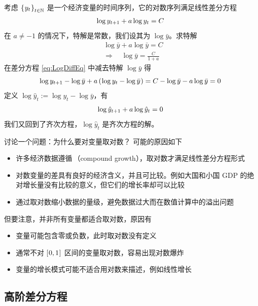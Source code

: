 考虑 \(\bkd{y_t}_{t\in\bb N}\) 是一个经济变量的时间序列，它的对数序列满足线性差分方程
\begin{align}\label{eq:LogDiffEq}
    \operatorname{log} y_{t+1}+a\operatorname{log} y_t=C
\end{align}
在 \(a\neq -1\) 的情况下，特解是常数，我们设其为 \(\log\bar y\)。求特解
\begin{align}
    &\log\bar y + a\log\bar y = C \label{eq:LogDiffEqTrend}\\
    &\Rightarrow \quad \log \bar y = \frac C{1+a}
\end{align}
在差分方程 \ref{eq:LogDiffEq} 中减去特解 \(\log\bar y\) 得
\begin{equation}
    \operatorname{log} y_{t+1} - \operatorname{log}\bar y + a\left(\mspace{1mu}\operatorname{log} y_t - \operatorname{log}\bar y\mspace{1mu}\right) = C - \operatorname{log}\bar y - a\operatorname{log}\bar y = 0
\end{equation}
定义 \(\log\hat y_t := \log y_t - \log\bar y\)，有
\begin{equation}
    \operatorname{log}\hat y_{t+1} + a\operatorname{log}\hat y_t = 0\label{eq:LogDiffEqCycle}
\end{equation}
我们又回到了齐次方程，\(\log\hat y_t\) 是齐次方程的解。

讨论一个问题：{\kaiti 为什么要对变量取对数？} 可能的原因如下
\begin{itemize}
    \item 许多经济数据遵循\,（compound growth），取对数才满足线性差分方程形式
    \item 对数变量的差具有良好的经济含义，并且可比较。例如大国和小国 GDP 的绝对增长量没有比较的意义，但它们的增长率却可以比较
    \item 通过取对数缩小数据的量级，避免数据过大而在数值计算中的溢出问题
\end{itemize}
但要注意，并非所有变量都适合取对数，原因有
\begin{itemize}
    \item 变量可能包含零或负数，此时取对数没有定义
    \item 通常不对 \(\left[\mspace{1mu}0,1\mspace{1mu}\right]\) 区间的变量取对数，容易出现对数爆炸
    \item 变量的增长模式可能不适合用对数来描述，例如线性增长
\end{itemize}

\subsection{高阶差分方程}\label{subsec:HDiffEqu}

